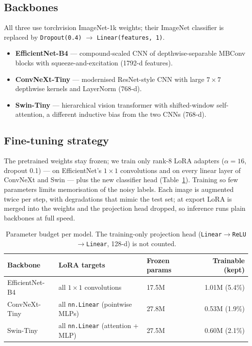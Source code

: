 \documentclass[11pt,a4paper]{article}
\begin{document}
\subsection{Backbones}
All three use torchvision ImageNet-1k weights; their ImageNet classifier is replaced by \texttt{Dropout(0.4)} $\rightarrow$ \texttt{Linear(features, 1)}.
\begin{itemize}
\item \textbf{EfficientNet-B4} --- compound-scaled CNN of depthwise-separable MBConv blocks with squeeze-and-excitation (1792-d features).
\item \textbf{ConvNeXt-Tiny} --- modernised ResNet-style CNN with large $7\times7$ depthwise kernels and LayerNorm (768-d).
\item \textbf{Swin-Tiny} --- hierarchical vision transformer with shifted-window self-attention, a different inductive bias from the two CNNs (768-d).
\end{itemize}

\subsection{Fine-tuning strategy}
The pretrained weights stay frozen; we train only rank-8 LoRA adapters ($\alpha=16$, dropout 0.1) --- on EfficientNet's $1\times1$ convolutions and on every linear layer of ConvNeXt and Swin --- plus the new classifier head (Table~\ref{tab:params}). Training so few parameters limits memorisation of the noisy labels. Each image is augmented twice per step, with degradations that mimic the test set; at export LoRA is merged into the weights and the projection head dropped, so inference runs plain backbones at full speed.

\begin{table}[H]
\centering\small
\begin{tabular}{@{}lllr@{}}
\toprule
Backbone & LoRA targets & Frozen params & Trainable (kept) \\
\midrule
EfficientNet-B4 & all $1\times1$ convolutions & 17.5M & 1.01M (5.4\%) \\
ConvNeXt-Tiny & all \texttt{nn.Linear} (pointwise MLPs) & 27.8M & 0.53M (1.9\%) \\
Swin-Tiny & all \texttt{nn.Linear} (attention + MLP) & 27.5M & 0.60M (2.1\%) \\
\bottomrule
\end{tabular}
\caption{Parameter budget per model. The training-only projection head (\texttt{Linear}$\rightarrow$\texttt{ReLU}$\rightarrow$\texttt{Linear}, 128-d) is not counted.}
\label{tab:params}
\end{table}
\end{document}
